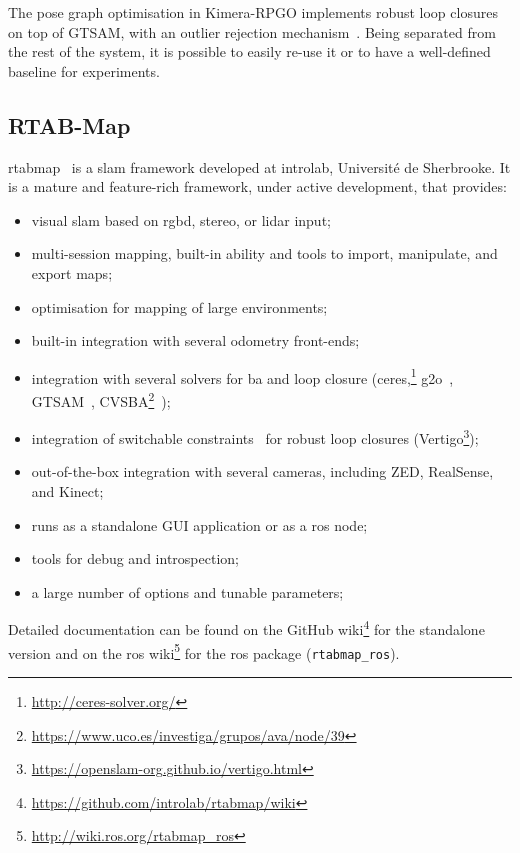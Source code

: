 \documentclass[11pt, letterpaper, twoside]{article}
\begin{document}
The pose graph optimisation in Kimera-RPGO implements robust loop closures on
top of GTSAM, with an outlier rejection mechanism~\cite{mangelson2018pairwise}.
Being separated from the rest of the system, it is possible to easily re-use
it or to have a well-defined baseline for experiments.

\subsection{RTAB-Map}

\gls{rtabmap}~\cite{labbe2019rtab} is a \gls{slam} framework developed at
\gls{introlab}, Université de Sherbrooke. It is a mature and feature-rich
framework, under active development, that provides:
\begin{itemize}
    \item visual \gls{slam} based on \gls{rgbd}, stereo, or lidar input;
    \item multi-session mapping, built-in ability and tools to import,
        manipulate, and export maps;
    \item optimisation for mapping of large environments;
    \item built-in integration with several odometry front-ends;
    \item integration with several solvers for \gls{ba} and loop closure
        (ceres,\footnote{\url{http://ceres-solver.org/}}
        g2o~\cite{grisetti2011g2o}, GTSAM~\cite{dellaert2006square},
        CVSBA\footnote{\url{https://www.uco.es/investiga/grupos/ava/node/39}}~\cite{lourakis2009sba});
    \item integration of switchable constraints~\cite{sunderhauf2012switchable}
        for robust loop closures
        (Vertigo\footnote{\url{https://openslam-org.github.io/vertigo.html}});
    \item out-of-the-box integration with several cameras, including ZED,
        RealSense, and Kinect;
    \item runs as a standalone GUI application or as a \gls{ros} node;
    \item tools for debug and introspection;
    \item a large number of options and tunable parameters;
\end{itemize}

Detailed documentation can be found on the GitHub
wiki\footnote{\url{https://github.com/introlab/rtabmap/wiki}} for the
standalone version and on the \gls{ros}
wiki\footnote{\url{http://wiki.ros.org/rtabmap_ros}} for the \gls{ros} package
(\texttt{rtabmap\_ros}).
\end{document}
